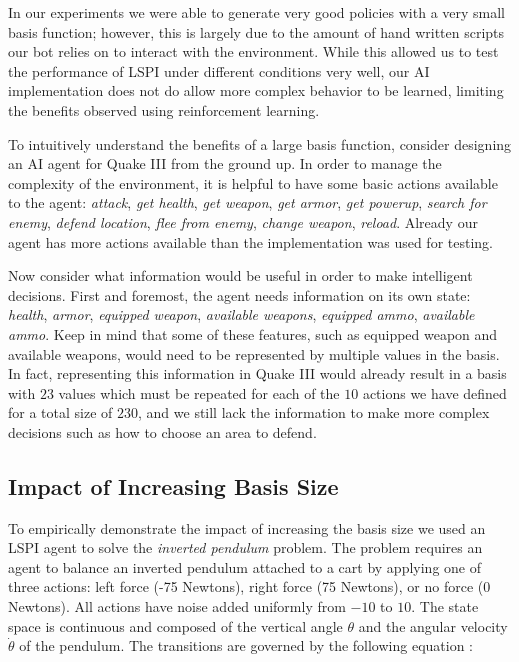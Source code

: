 In our experiments we were able to generate very good policies with a very small basis function; however, this is largely due to the amount of hand written scripts our bot relies on to interact with the environment. While this allowed us to test the performance of LSPI under different conditions very well, our AI implementation does not do allow more complex behavior to be learned, limiting the benefits observed using reinforcement learning.

To intuitively understand the benefits of a large basis function, consider designing an AI agent for Quake III from the ground up. In order to manage the complexity of the environment, it is helpful to have some basic actions available to the agent: \emph{attack}, \emph{get health}, \emph{get weapon}, \emph{get armor}, \emph{get powerup}, \emph{search for enemy}, \emph{defend location}, \emph{flee from enemy}, \emph{change weapon}, \emph{reload}. Already our agent has more actions available than the implementation was used for testing.

Now consider what information would be useful in order to make intelligent decisions. First and foremost, the agent needs information on its own state: \emph{health}, \emph{armor}, \emph{equipped weapon}, \emph{available weapons}, \emph{equipped ammo}, \emph{available ammo}. Keep in mind that some of these features, such as equipped weapon and available weapons, would need to be represented by multiple values in the basis. In fact, representing this information in Quake III would already result in a basis with $23$ values which must be repeated for each of the $10$ actions we have defined for a total size of $230$, and we still lack the information to make more complex decisions such as how to choose an area to defend.

\subsection{Impact of Increasing Basis Size}

To empirically demonstrate the impact of increasing the basis size we used an LSPI agent to solve the \emph{inverted pendulum} problem. The problem requires an agent to balance an inverted pendulum attached to a cart by applying one of three actions: left force (-75 Newtons), right force (75 Newtons), or no force (0 Newtons). All actions have noise added uniformly from $-10$ to $10$. The state space is continuous and composed of the vertical angle $\theta$ and the angular velocity $\dot{\theta}$ of the pendulum. The transitions are governed by the following equation \cite{lspi}:

